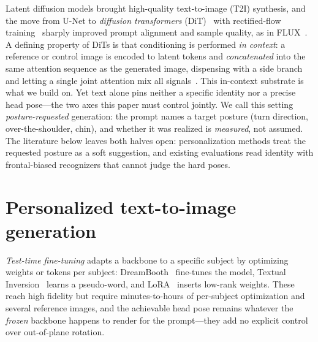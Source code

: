 \label{sec:related}

Latent diffusion models brought high-quality text-to-image (T2I) synthesis, and the move from U-Net to \emph{diffusion transformers} (DiT)~\cite{dit,sd3} with rectified-flow training~\cite{rectifiedflow,flowmatching} sharply improved prompt alignment and sample quality, as in FLUX~\cite{flux}. A defining property of DiTs is that conditioning is performed \emph{in context}: a reference or control image is encoded to latent tokens and \emph{concatenated} into the same attention sequence as the generated image, dispensing with a side branch and letting a single joint attention mix all signals~\cite{ominicontrol,fluxkontext}. This in-context substrate is what we build on. Yet text alone pins neither a specific identity nor a precise head pose---the two axes this paper must control jointly. We call this setting \emph{posture-requested} generation: the prompt names a target posture (turn direction, over-the-shoulder, chin), and whether it was realized is \emph{measured}, not assumed. The literature below leaves both halves open: personalization methods treat the requested posture as a soft suggestion, and existing evaluations read identity with frontal-biased recognizers that cannot judge the hard poses.

\section{Personalized text-to-image generation}
\emph{Test-time fine-tuning} adapts a backbone to a specific subject by optimizing weights or tokens per subject: DreamBooth~\cite{dreambooth} fine-tunes the model, Textual Inversion~\cite{textinv} learns a pseudo-word, and LoRA~\cite{lora} inserts low-rank weights. These reach high fidelity but require minutes-to-hours of per-subject optimization and several reference images, and the achievable head pose remains whatever the \emph{frozen} backbone happens to render for the prompt---they add no explicit control over out-of-plane rotation.

